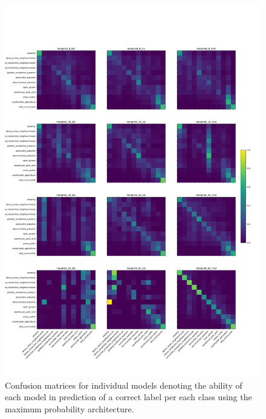 \documentclass[]{interact}
\theoremstyle{plain}%
\theoremstyle{definition}
\theoremstyle{remark}
\begin{document}
\begin{figure}
    \centering
    \includegraphics[width=.9\linewidth]{fig/maxprob_cm.png}
    \caption{\footnotesize Confusion matrices for individual models denoting
    the ability of each model in prediction of a correct label per each class
    using the maximum probability architecture.}
    \label{fig:maxprob_cm}
\end{figure}
\end{document}
